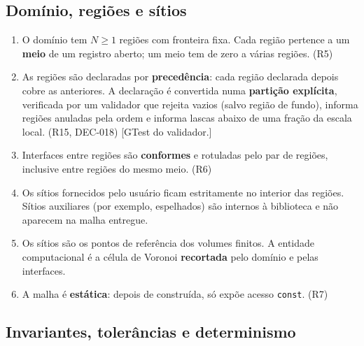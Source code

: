 \subsection{Domínio, regiões e sítios}

\begin{enumerate}
  \item O domínio tem $N \geq 1$ regiões com fronteira fixa. Cada região pertence a um \textbf{meio} de um
        registro aberto; um meio tem de zero a várias regiões. (R5)
  \item As regiões são declaradas por \textbf{precedência}: cada região declarada depois cobre as anteriores. A
        declaração é convertida numa \textbf{partição explícita}, verificada por um validador que rejeita vazios
        (salvo região de fundo), informa regiões anuladas pela ordem e informa lascas abaixo de uma fração da
        escala local. (R15, DEC-018)
        [GTest do validador.]
  \item Interfaces entre regiões são \textbf{conformes} e rotuladas pelo par de regiões, inclusive entre regiões
        do mesmo meio. (R6)
  \item Os sítios fornecidos pelo usuário ficam estritamente no interior das regiões. Sítios auxiliares (por
        exemplo, espelhados) são internos à biblioteca e não aparecem na malha entregue.
  \item Os sítios são os pontos de referência dos volumes finitos. A entidade computacional é a célula de
        Voronoi \textbf{recortada} pelo domínio e pelas interfaces.
  \item A malha é \textbf{estática}: depois de construída, só expõe acesso \texttt{const}. (R7)
\end{enumerate}

\subsection{Invariantes, tolerâncias e determinismo}

